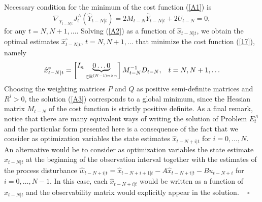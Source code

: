 \documentclass[11pt,journal,onecolumn]{IEEEtran}
\begin{document}
Necessary condition for the minimum of the cost function (\ref{A1}) is
\begin{equation}\label{A2}
\nabla_{\hat{Y}_{t-N|t}}J_{t}^{A}(\hat{Y}_{t-N|t})=2M_{t-N}\hat{Y}_{t-N|t}+2U_{t-N}=0,
\end{equation}
for any $t =N,N+1,\ldots$. Solving (\ref{A2}) as a function of $\hat{x}_{t-N|t}$, we obtain the optimal estimates $\hat{x}^{\circ}_{t-N|t}$, $t=N,N+1,\ldots$ that minimize the cost function (\ref{17}), namely
\begin{equation}\label{A3}
\hat{x}^{\circ}_{t-N|t}=
\begin{bmatrix}I_{n} \underbrace{0 \ldots 0}_{\in\mathbb{R}^{(N-1)n\times n}} \end{bmatrix}M_{t-N}^{-1}D_{t-N},\hspace{3mm}t=N,N+1,\ldots
\end{equation}
Choosing the weighting matrices $P$ and $Q$ as positive semi-definite matrices and $R^{i}>0$, the solution (\ref{A3}) corresponds to a global minimum, since the Hessian matrix $M_{t-N}$ of the cost function is strictly positive definite. As a final remark, notice that there are many equivalent ways of writing the solution of Problem $E_{t}^{A}$ and the particular form presented here is a consequence of the fact
that we consider as optimization variables the state estimates $\hat x_{t-N+i|t}$ for $i = 0, \ldots, N$. An alternative would be to consider as optimization variables the state estimate
$\hat x_{t-N|t}$ at the beginning of the observation interval together with the estimates of the process disturbance $\hat w_{t-N+i|t} = \hat x_{t-N+i+1|t}  - A \hat x_{t-N+i|t} - B u_{t-N+i} $ for
$i = 0, \ldots, N-1$. In this case, each $\hat x_{t-N+i|t}$  would be written as a function of $\hat x_{t-N|t}$ and the observability matrix would explicitly appear in the solution.
\mbox{ } \hfill $\square$
\vspace{.5cm}
\end{document}
